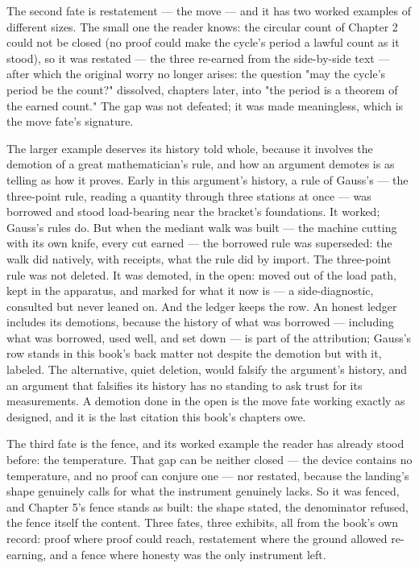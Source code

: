 The second fate is restatement --- the move --- and it has two worked examples of
different sizes. The small one the reader knows: the circular count of Chapter 2
could not be closed (no proof could make the cycle's period a lawful count as it
stood), so it was restated --- the three re-earned from the side-by-side text ---
after which the original worry no longer arises: the question "may the cycle's
period be the count?" dissolved, chapters later, into "the period is a theorem of
the earned count." The gap was not defeated; it was made meaningless, which is the
move fate's signature.

The larger example deserves its history told whole, because it involves the demotion
of a great mathematician's rule, and how an argument demotes is as telling as how it
proves. Early in this argument's history, a rule of Gauss's --- the three-point
rule, reading a quantity through three stations at once --- was borrowed and stood
load-bearing near the bracket's foundations. It worked; Gauss's rules do. But when
the mediant walk was built --- the machine cutting with its own knife, every cut
earned --- the borrowed rule was superseded: the walk did natively, with receipts,
what the rule did by import. The three-point rule was not deleted. It was demoted,
in the open: moved out of the load path, kept in the apparatus, and marked for what
it now is --- a side-diagnostic, consulted but never leaned on. And the ledger keeps
the row. An honest ledger includes its demotions, because the history of what was
borrowed --- including what was borrowed, used well, and set down --- is part of the
attribution; Gauss's row stands in this book's back matter not despite the demotion
but with it, labeled. The alternative, quiet deletion, would falsify the argument's
history, and an argument that falsifies its history has no standing to ask trust for
its measurements. A demotion done in the open is the move fate working exactly as
designed, and it is the last citation this book's chapters owe.

The third fate is the fence, and its worked example the reader has already stood
before: the temperature. That gap can be neither closed --- the device contains no
temperature, and no proof can conjure one --- nor restated, because the landing's
shape genuinely calls for what the instrument genuinely lacks. So it was fenced,
and Chapter 5's fence stands as built: the shape stated, the denominator refused,
the fence itself the content. Three fates, three exhibits, all from the book's own
record: proof where proof could reach, restatement where the ground allowed
re-earning, and a fence where honesty was the only instrument left.

